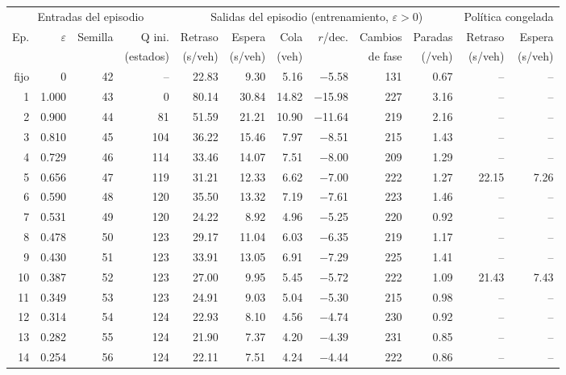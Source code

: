 \begin{table}[H]
\centering
\scriptsize
\setlength{\tabcolsep}{3pt}
\begin{tabular}{rrrrrrrrrrrr}
\toprule
\multicolumn{4}{c}{Entradas del episodio} & \multicolumn{6}{c}{Salidas del episodio (entrenamiento, $\varepsilon>0$)} & \multicolumn{2}{c}{Política congelada} \\
\cmidrule(lr){1-4}\cmidrule(lr){5-10}\cmidrule(lr){11-12}
Ep. & $\varepsilon$ & Semilla & Q ini. & Retraso & Espera & Cola & $r$/dec. & Cambios & Paradas & Retraso & Espera \\
 &  &  & (estados) & (s/veh) & (s/veh) & (veh) &  & de fase & (/veh) & (s/veh) & (s/veh) \\
\midrule
fijo & 0 & 42 & -- & 22.83 & 9.30 & 5.16 & $-$5.58 & 131 & 0.67 & -- & -- \\
\midrule
1 & 1.000 & 43 & 0 & 80.14 & 30.84 & 14.82 & $-$15.98 & 227 & 3.16 & -- & -- \\
2 & 0.900 & 44 & 81 & 51.59 & 21.21 & 10.90 & $-$11.64 & 219 & 2.16 & -- & -- \\
3 & 0.810 & 45 & 104 & 36.22 & 15.46 & 7.97 & $-$8.51 & 215 & 1.43 & -- & -- \\
4 & 0.729 & 46 & 114 & 33.46 & 14.07 & 7.51 & $-$8.00 & 209 & 1.29 & -- & -- \\
5 & 0.656 & 47 & 119 & 31.21 & 12.33 & 6.62 & $-$7.00 & 222 & 1.27 & 22.15 & 7.26 \\
6 & 0.590 & 48 & 120 & 35.50 & 13.32 & 7.19 & $-$7.61 & 223 & 1.46 & -- & -- \\
7 & 0.531 & 49 & 120 & 24.22 & 8.92 & 4.96 & $-$5.25 & 220 & 0.92 & -- & -- \\
8 & 0.478 & 50 & 123 & 29.17 & 11.04 & 6.03 & $-$6.35 & 219 & 1.17 & -- & -- \\
9 & 0.430 & 51 & 123 & 33.91 & 13.05 & 6.91 & $-$7.29 & 225 & 1.41 & -- & -- \\
10 & 0.387 & 52 & 123 & 27.00 & 9.95 & 5.45 & $-$5.72 & 222 & 1.09 & 21.43 & 7.43 \\
11 & 0.349 & 53 & 123 & 24.91 & 9.03 & 5.04 & $-$5.30 & 215 & 0.98 & -- & -- \\
12 & 0.314 & 54 & 124 & 22.93 & 8.10 & 4.56 & $-$4.74 & 230 & 0.92 & -- & -- \\
13 & 0.282 & 55 & 124 & 21.90 & 7.37 & 4.20 & $-$4.39 & 231 & 0.85 & -- & -- \\
14 & 0.254 & 56 & 124 & 22.11 & 7.51 & 4.24 & $-$4.44 & 222 & 0.86 & -- & -- \\

\end{tabular}
\end{table}
